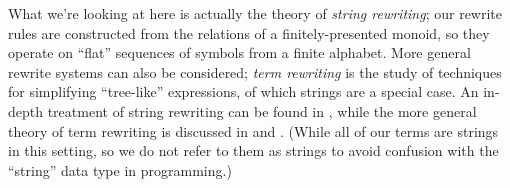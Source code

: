 \documentclass[../generics]{subfiles}
\begin{document}
What we're looking at here is actually the theory of \emph{string rewriting}; our rewrite rules are constructed from the relations of a finitely-presented monoid, so they operate on ``flat'' sequences of symbols from a finite alphabet. More general rewrite systems can also be considered; \emph{term rewriting} is the study of techniques for simplifying ``tree-like'' expressions, of which strings are a special case. An in-depth treatment of string rewriting can be found in \cite{book2012string}, while the more general theory of term rewriting is discussed in \cite{andallthat} and \cite{formalmans6}. (While all of our terms are strings in this setting, so we do not refer to them as strings to avoid confusion with the ``string'' data type in programming.)
\end{document}
